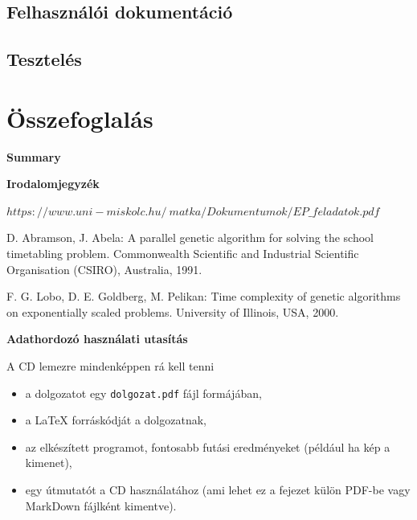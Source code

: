 \documentclass[12pt,a4paper]{report}
\begin{document}
\subsection{Felhasználói dokumentáció}

\subsection{Tesztelés}

\newpage

\section{Összefoglalás}

\newpage

\textbf{Summary}

\newpage

\clearpage




\textbf{Irodalomjegyzék}

\noindent [1]\quad $https://www.uni-miskolc.hu/~matka/Dokumentumok/EP\_feladatok.pdf$
 
\noindent [2]\quad D. Abramson, J. Abela: A parallel genetic algorithm for solving the school timetabling problem.
Commonwealth Scientific and Industrial Scientific Organisation (CSIRO), Australia, 1991.

\noindent [3]\quad F. G. Lobo, D. E. Goldberg, M. Pelikan: Time complexity of genetic algorithms on exponentially scaled problems.
University of Illinois, USA, 2000. 

\newpage

\pagestyle{empty}

\noindent \textbf{\Large Adathordozó használati utasítás}

\vskip 1cm

A CD lemezre mindenképpen rá kell tenni
\begin{itemize}
\item a dolgozatot egy \texttt{dolgozat.pdf} fájl formájában,
\item a LaTeX forráskódját a dolgozatnak,
\item az elkészített programot, fontosabb futási eredményeket (például ha kép a kimenet),
\item egy útmutatót a CD használatához (ami lehet ez a fejezet külön PDF-be vagy MarkDown fájlként kimentve).
\end{itemize}
\end{document}
